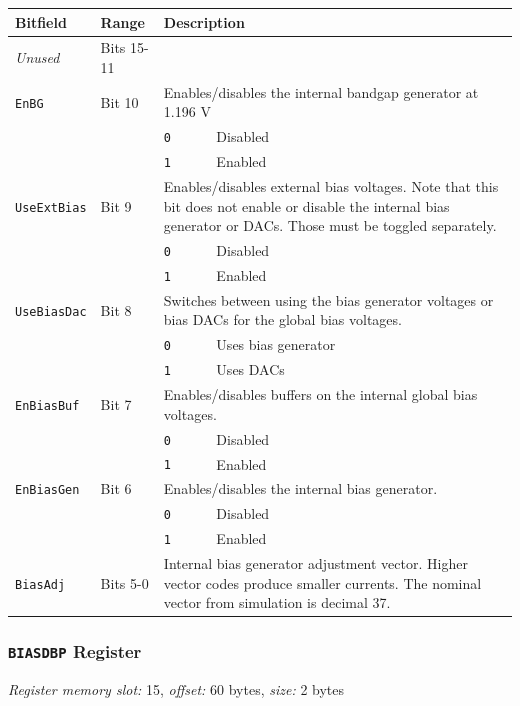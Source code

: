 \begin{tabularx}{\textwidth}{ l l l X }
\textbf{Bitfield} & \textbf{Range} & \multicolumn{2}{X}{\textbf{Description}} \\ \hline
\textit{Unused} & Bits 15-11 & \multicolumn{2}{X}{} \\
\hline
\texttt{EnBG} & Bit 10 & \multicolumn{2}{X}{Enables/disables the internal bandgap generator at 1.196 V} \\
 & & \texttt{0} & Disabled \\
 & & \cellcolor{tablehighlightcolor}\texttt{1} & \cellcolor{tablehighlightcolor}Enabled \\
\hline
\texttt{UseExtBias} & Bit 9 & \multicolumn{2}{X}{Enables/disables external bias voltages. Note that this bit does not enable or disable the internal bias generator or DACs. Those must be toggled separately.} \\
 & & \texttt{0} & Disabled \\
 & & \cellcolor{tablehighlightcolor}\texttt{1} & \cellcolor{tablehighlightcolor}Enabled \\
\hline
\texttt{UseBiasDac} & Bit 8 & \multicolumn{2}{X}{Switches between using the bias generator voltages or bias DACs for the global bias voltages.} \\
 & & \texttt{0} & Uses bias generator \\
 & & \cellcolor{tablehighlightcolor}\texttt{1} & \cellcolor{tablehighlightcolor}Uses DACs \\
\hline
\texttt{EnBiasBuf} & Bit 7 & \multicolumn{2}{X}{Enables/disables buffers on the internal global bias voltages.} \\
 & & \texttt{0} & Disabled \\
 & & \cellcolor{tablehighlightcolor}\texttt{1} & \cellcolor{tablehighlightcolor}Enabled \\
\hline
\texttt{EnBiasGen} & Bit 6 & \multicolumn{2}{X}{Enables/disables the internal bias generator.} \\
 & & \texttt{0} & Disabled \\
 & & \cellcolor{tablehighlightcolor}\texttt{1} & \cellcolor{tablehighlightcolor}Enabled \\
\hline
\texttt{BiasAdj} & Bits 5-0 & \multicolumn{2}{X}{Internal bias generator adjustment vector. Higher vector codes produce smaller currents. The nominal vector from simulation is decimal 37.} \\
\hline
\end{tabularx}

\subsubsection{\texttt{BIASDBP} Register} \label{ss:BIASDBP}
\noindent \textit{Register memory slot:} 15, \textit{offset:} 60 bytes, \textit{size:} 2 bytes

